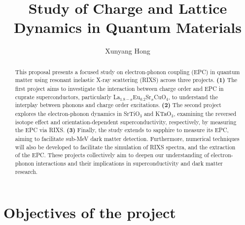 \documentclass[11pt]{article}
\begin{document}
\title{Study of Charge and Lattice Dynamics in Quantum Materials}
\author{Xunyang Hong}
\date{}
\maketitle





\begin{abstract}
This proposal presents a focused study on electron-phonon coupling (EPC) in quantum matter using resonant inelastic X-ray scattering (RIXS) across three projects. \textbf{(1)} The first project aims to investigate the interaction between charge order and EPC in cuprate superconductors, particularly {La$_{1.8-x}$Eu$_{0.2}$Sr$_x$CuO$_{4}$}, to understand the interplay between phonons and charge order excitations. \textbf{(2)} The second project explores the electron-phonon dynamics in SrTiO$_{3}$ and KTaO$_{3}$, examining the reversed isotope effect and orientation-dependent superconductivity, respectively, by measuring the EPC via RIXS. \textbf{(3)} Finally, the study extends to sapphire to measure its EPC, aiming to facilitate sub-MeV dark matter detection.
Furthermore, numerical techniques will also be developed to facilitate the simulation of RIXS spectra, and the extraction of the EPC. These projects collectively aim to deepen our understanding of electron-phonon interactions and their implications in superconductivity and dark matter research.
\end{abstract}

\section{Objectives of the project}

\end{document}

